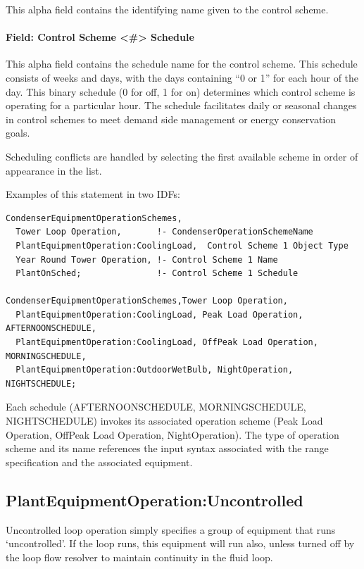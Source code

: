 This alpha field contains the identifying name given to the control scheme.

\paragraph{Field: Control Scheme \textless{}\#\textgreater{} Schedule}\label{field-control-scheme-schedule-1}

This alpha field contains the schedule name for the control scheme. This schedule consists of weeks and days, with the days containing ``0 or 1'' for each hour of the day. This binary schedule (0 for off, 1 for on) determines which control scheme is operating for a particular hour. The schedule facilitates daily or seasonal changes in control schemes to meet demand side management or energy conservation goals.

Scheduling conflicts are handled by selecting the first available scheme in order of appearance in the list.

Examples of this statement in two IDFs:

\begin{lstlisting}
CondenserEquipmentOperationSchemes,
  Tower Loop Operation,       !- CondenserOperationSchemeName
  PlantEquipmentOperation:CoolingLoad,  Control Scheme 1 Object Type
  Year Round Tower Operation, !- Control Scheme 1 Name
  PlantOnSched;               !- Control Scheme 1 Schedule

CondenserEquipmentOperationSchemes,Tower Loop Operation,
  PlantEquipmentOperation:CoolingLoad, Peak Load Operation, AFTERNOONSCHEDULE,
  PlantEquipmentOperation:CoolingLoad, OffPeak Load Operation, MORNINGSCHEDULE,
  PlantEquipmentOperation:OutdoorWetBulb, NightOperation, NIGHTSCHEDULE;
\end{lstlisting}

Each schedule (AFTERNOONSCHEDULE, MORNINGSCHEDULE, NIGHTSCHEDULE) invokes its associated operation scheme (Peak Load Operation, OffPeak Load Operation, NightOperation). The type of operation scheme and its name references the input syntax associated with the range specification and the associated equipment.

\subsection{PlantEquipmentOperation:Uncontrolled}\label{plantequipmentoperationuncontrolled}

Uncontrolled loop operation simply specifies a group of equipment that runs `uncontrolled'. If the loop runs, this equipment will run also, unless turned off by the loop flow resolver to maintain continuity in the fluid loop.

